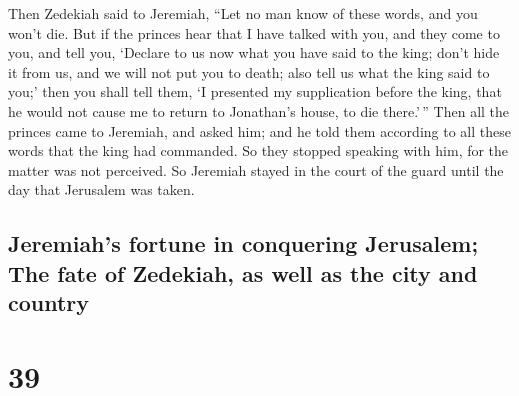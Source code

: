  Then Zedekiah said to Jeremiah, ``Let no man know of
these words, and you won't die.  But if the princes hear
that I have talked with you, and they come to you, and tell you,
`Declare to us now what you have said to the king; don't hide it from
us, and we will not put you to death; also tell us what the king said to
you;'  then you shall tell them, `I presented my
supplication before the king, that he would not cause me to return to
Jonathan's house, to die there.'\,''  Then all the
princes came to Jeremiah, and asked him; and he told them according to
all these words that the king had commanded. So they stopped speaking
with him, for the matter was not perceived.  So Jeremiah
stayed in the court of the guard until the day that Jerusalem was taken.

\hypertarget{jeremiahs-fortune-in-conquering-jerusalem-the-fate-of-zedekiah-as-well-as-the-city-and-country}{%
\subsection{Jeremiah's fortune in conquering Jerusalem; The fate of
Zedekiah, as well as the city and
country}\label{jeremiahs-fortune-in-conquering-jerusalem-the-fate-of-zedekiah-as-well-as-the-city-and-country}}

\hypertarget{section-38}{%
\section{39}\label{section-38}}

